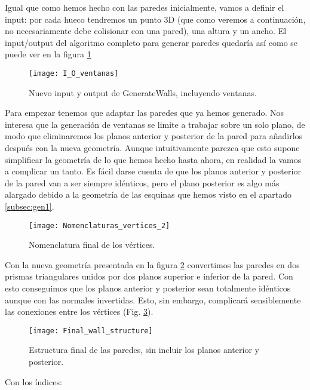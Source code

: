 Igual que como hemos hecho con las paredes inicialmente, vamos a definir el input: por cada hueco tendremos un punto 3D (que como veremos a continuación, no necesariamente debe colisionar con una pared), una altura y un ancho. El input/output del algoritmo completo para generar paredes quedaría así como se puede ver en la figura \ref{fig:io_generatewindows}

\begin{figure}[H]
    \centering
    \texttt{[image: I\_O\_ventanas]}
    \caption{Nuevo input y output de GenerateWalls, incluyendo ventanas.}
    \label{fig:io_generatewindows}
\end{figure}

Para empezar tenemos que adaptar las paredes que ya hemos generado. Nos interesa que la generación de ventanas se limite a trabajar sobre un solo plano, de modo que eliminaremos los planos anterior y posterior de la pared para añadirlos después con la nueva geometría. Aunque intuitivamente parezca que esto supone simplificar la geometría de lo que hemos hecho hasta ahora, en realidad la vamos a complicar un tanto. Es fácil darse cuenta de que los planos anterior y posterior de la pared van a ser siempre idénticos, pero el plano posterior es algo más alargado debido a la geometría de las esquinas que hemos visto en el apartado \ref{subsec:gen1}.

\begin{figure}[H]
    \centering
    \texttt{[image: Nomenclaturas\_vertices\_2]}
    \caption{Nomenclatura final de los vértices.}
    \label{fig:nomenclatura_vertices_2}
\end{figure}

Con la nueva geometría presentada en la figura \ref{fig:nomenclatura_vertices_2} convertimos las paredes en dos prismas triangulares unidos por dos planos superior e inferior de la pared. Con esto conseguimos que los planos anterior y posterior sean totalmente idénticos aunque con las normales invertidas. Esto, sin embargo, complicará sensiblemente las conexiones entre los vértices (Fig. \ref{fig:nueva_estructura}).

\begin{figure}[H]
    \centering
    \texttt{[image: Final\_wall\_structure]}
    \caption{Estructura final de las paredes, sin incluir los planos anterior y posterior.}
    \label{fig:nueva_estructura}
\end{figure}

Con los índices:

